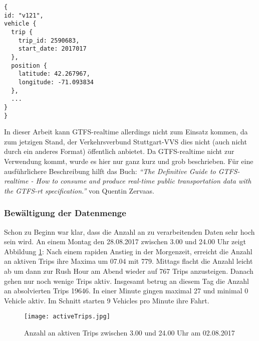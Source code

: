     \begin{lstlisting}[captionpos={b},caption={Auszug eines GTFS-realtime Vehicle-Position Updates von MBTA},label={lst:gtfs_rt_vehicle_position_update}]
{
id: "v121",
vehicle {
  trip {
    trip_id: 2590683,
    start_date: 2017017
  },
  position {
    latitude: 42.267967,
    longitude: -71.093834
  },
  ...
}
}
    \end{lstlisting}

    In dieser Arbeit kann GTFS-realtime allerdings nicht zum Einsatz kommen, da zum jetzigen Stand, der Verkehrsverbund Stuttgart-VVS dies nicht (auch nicht durch ein anderes Format) öffentlich anbietet. Da GTFS-realtime nicht zur Verwendung kommt, wurde es hier nur ganz kurz und grob beschrieben. Für eine ausführlichere Beschreibung hilft das Buch: \textit{"`The Definitive Guide to GTFS-realtime - How to consume and produce real-time public transportation data with the GTFS-rt specification."'}\parencite{zervaas_realtime} von Quentin Zervaas.\\


  \subsubsection{Bewältigung der Datenmenge}
  \label{ssub:bewältigung_der_datenmenge}
    Schon zu Beginn war klar, dass die Anzahl an zu verarbeitenden Daten sehr hoch sein wird. An einem Montag den 28.08.2017 zwischen 3.00 und 24.00 Uhr zeigt Abbildung \ref{fig:activeTrips}: Nach einem rapiden Anstieg in der Morgenzeit, erreicht die Anzahl an aktiven Trips ihre Maxima um 07.04 mit 779. Mittags flacht die Anzahl leicht ab um dann zur Rush Hour am Abend wieder auf 767 Trips anzusteigen. Danach gehen nur noch wenige Trips aktiv. Insgesamt betrug an diesem Tag die Anzahl an absolvierten Trips 19646. In einer Minute gingen maximal 27 und minimal 0 Vehicle aktiv. Im Schnitt starten 9 Vehicles pro Minute ihre Fahrt. 

    \begin{figure}[htbp]
      \begin{center}
        \texttt{[image: activeTrips.jpg]}
        \caption{Anzahl an aktiven Trips zwischen 3.00 und 24.00 Uhr am 02.08.2017}
        \label{fig:activeTrips}
      \end{center}
    \end{figure}

